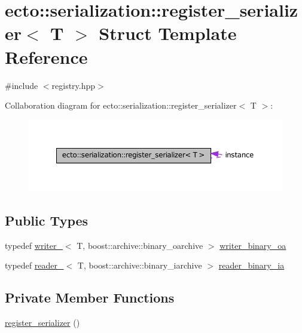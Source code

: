 \hypertarget{structecto_1_1serialization_1_1register__serializer}{\section{ecto\-:\-:serialization\-:\-:register\-\_\-serializer$<$ \-T $>$ \-Struct \-Template \-Reference}
\label{structecto_1_1serialization_1_1register__serializer}
}


{\ttfamily \#include $<$registry.\-hpp$>$}



\-Collaboration diagram for ecto\-:\-:serialization\-:\-:register\-\_\-serializer$<$ \-T $>$\-:\nopagebreak
\begin{figure}[H]
\begin{center}
\leavevmode
\includegraphics[width=350pt]{structecto_1_1serialization_1_1register__serializer__coll__graph}
\end{center}
\end{figure}
\subsection*{\-Public \-Types}
\begin{DoxyCompactItemize}
\item 
typedef \hyperlink{structecto_1_1serialization_1_1writer__}{writer\-\_\-}$<$ \-T, \*
boost\-::archive\-::binary\-\_\-oarchive $>$ \hyperlink{structecto_1_1serialization_1_1register__serializer_a31c9f04624076aa209e66232a511c627}{writer\-\_\-binary\-\_\-oa}
\item 
typedef \hyperlink{structecto_1_1serialization_1_1reader__}{reader\-\_\-}$<$ \-T, \*
boost\-::archive\-::binary\-\_\-iarchive $>$ \hyperlink{structecto_1_1serialization_1_1register__serializer_a7783674d19bdb5a7f2143953d6a7302f}{reader\-\_\-binary\-\_\-ia}
\end{DoxyCompactItemize}
\subsection*{\-Private \-Member \-Functions}
\begin{DoxyCompactItemize}
\item 
\hyperlink{structecto_1_1serialization_1_1register__serializer_ae339eb881e0afbb36bff03a34263c683}{register\-\_\-serializer} ()
\end{DoxyCompactItemize}
